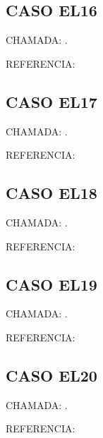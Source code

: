\documentclass{undftex}
\begin{document}
\begin{refsection}\section*{CASO EL16}\noindent CHAMADA: . \textcite{loc16}\par\noindent REFERENCIA:\par\printbibliography[heading=none,check=undfconsultadas]\end{refsection}\clearpage
\begin{refsection}\section*{CASO EL17}\noindent CHAMADA: . \textcite{loc17}\par\noindent REFERENCIA:\par\printbibliography[heading=none,check=undfconsultadas]\end{refsection}\clearpage
\begin{refsection}\section*{CASO EL18}\noindent CHAMADA: . \textcite{loc18}\par\noindent REFERENCIA:\par\printbibliography[heading=none,check=undfconsultadas]\end{refsection}\clearpage
\begin{refsection}\section*{CASO EL19}\noindent CHAMADA: . \textcite{loc19b}\par\noindent REFERENCIA:\par\printbibliography[heading=none,check=undfconsultadas]\end{refsection}\clearpage
\begin{refsection}\section*{CASO EL20}\noindent CHAMADA: . \textcite{loc19b}\par\noindent REFERENCIA:\par\printbibliography[heading=none,check=undfconsultadas]\end{refsection}\clearpage
\end{document}
